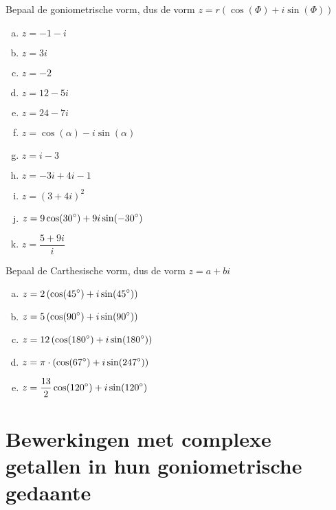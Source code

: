\documentclass[12pt,twoside]{article}
\begin{document}
\begin{oefening}
Bepaal de goniometrische vorm, dus de vorm $z=r(\cos(\Phi)+i\sin(\Phi))$
\begin{multicols}{2}
\begin{enumerate}[(a)]
  \itemsep.5em
  \item $\displaystyle z=-1-i$
  \item $\displaystyle z=3i$
  \item $\displaystyle z=-2$
  \item $\displaystyle z=12-5i$
  \item $\displaystyle z=24-7i$
  \item $\displaystyle z=\cos(\alpha)-i\sin(\alpha)$
  \item $\displaystyle z=i-3$
  \item $\displaystyle z=-3i+4i-1$
  \item $\displaystyle z=\left(3+4i\right)^2$
  \item $\displaystyle z=9\cos(30^\circ)+9i\sin(-30^\circ)$
  \item $\displaystyle z=\dfrac{5+9i}{i}$
\end{enumerate}
\end{multicols}
\end{oefening}

\begin{oefening}
Bepaal de Carthesische vorm, dus de vorm $z=a+bi$
\begin{enumerate}[(a)]
  \itemsep.5em
  \item $\displaystyle z=2\left(\cos(45^\circ)+i\sin(45^\circ)\right)$
  \item $\displaystyle z=5\left(\cos(90^\circ)+i\sin(90^\circ)\right)$
  \item $\displaystyle z=12\left(\cos(180^\circ)+i\sin(180^\circ)\right)$
  \item $\displaystyle z=\pi\cdot\left(\cos(67^\circ)+i\sin(247^\circ)\right)$
  \item $\displaystyle z=\dfrac{13}{2}\cos(120^\circ)+i\sin(120^\circ)$
\end{enumerate}
\end{oefening}

\pagebreak
\section{Bewerkingen met complexe getallen in hun goniometrische gedaante}
\end{document}
